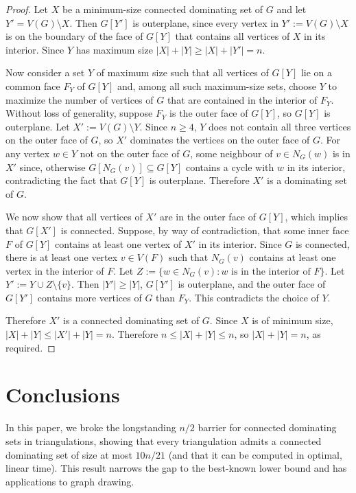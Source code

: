 \documentclass[11pt]{article}
\theoremstyle{definition}
\begin{document}
\begin{proof}
  Let $X$ be a minimum-size connected dominating set of $G$ and let $Y'=V(G)\setminus X$.  Then $G[Y']$ is outerplane, since every vertex in $Y':=V(G)\setminus X$ is on the boundary of the face of $G[Y]$ that contains all vertices of $X$ in its interior.  Since $Y$ has maximum size $|X|+|Y|\ge |X|+|Y'|= n$.

  Now consider a set $Y$ of maximum size such that all vertices of $G[Y]$ lie on a common face $F_Y$ of $G[Y]$ and, among all such maximum-size sets, choose $Y$ to maximize the number of vertices of $G$ that are contained in the interior of $F_Y$.  Without loss of generality, suppose $F_Y$ is the outer face of $G[Y]$, so $G[Y]$ is outerplane.  Let $X':=V(G)\setminus Y$. Since $n\ge 4$, $Y$ does not contain all three vertices on the outer face of $G$, so $X'$ dominates the vertices on the outer face of $G$. For any vertex $w\in Y$ not on the outer face of $G$, some neighbour of $v\in N_G(w)$ is in $X'$ since, otherwise $G[N_G(v)]\subseteq G[Y]$ contains a cycle with $w$ in its interior, contradicting the fact that $G[Y]$ is outerplane. Therefore $X'$ is a dominating set of $G$.

  We now show that all vertices of $X'$ are in the outer face of $G[Y]$, which implies that $G[X']$ is connected.  Suppose, by way of contradiction, that some inner face $F$ of $G[Y]$ contains at least one vertex of $X'$ in its interior.  Since $G$ is connected, there is at least one vertex $v\in V(F)$ such that $N_G(v)$ contains at least one vertex in the interior of $F$.  Let $Z:=\{w\in N_G(v):\text{$w$ is in the interior of $F$}\}$. Let $Y':=Y\cup Z \setminus\{v\}$.  Then $|Y'|\ge |Y|$, $G[Y']$ is outerplane, and the outer face of $G[Y']$ contains more vertices of $G$ than  $F_Y$. This contradicts the choice of $Y$.

  Therefore $X'$ is a connected dominating set of $G$.  Since $X$ is of minimum size, $|X|+|Y|\le |X'|+|Y|=n$.  Therefore $n\le |X|+|Y|\le n$, so $|X|+|Y|=n$, as required.
\end{proof}

\section{Conclusions}
\label{conclusions}
In this paper, we broke the longstanding $n/2$ barrier for connected dominating sets in triangulations, showing that every triangulation admits a connected dominating set of size at most $10n/21$ (and that it can be computed in optimal, linear time). This result narrows the gap to the best-known lower bound and has applications to graph drawing.
\end{document}
